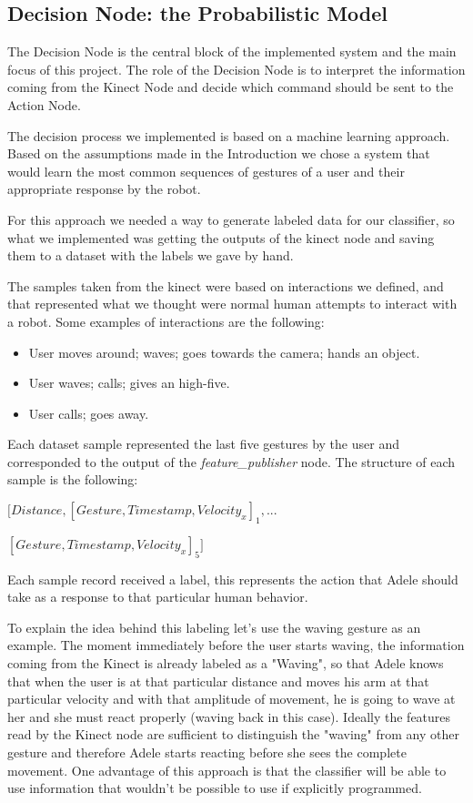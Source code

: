 \subsection{Decision Node: the Probabilistic Model}
The Decision Node is the central block of the implemented system and the main focus of this project. The role of the Decision Node is to interpret the information coming from the Kinect Node and decide which command should be sent to the Action Node.

The decision process we implemented is based on a machine learning approach. Based on the assumptions made in the Introduction we chose a system that would learn the most common sequences of gestures of a user and their appropriate response by the robot. 

For this approach we needed a way to generate labeled data for our classifier, so what we implemented was getting the outputs of the kinect node and saving them to a dataset with the labels we gave by hand.

The samples taken from the kinect were based on interactions we defined, and that represented what we thought were normal human attempts to interact with a robot. Some examples of interactions are the following:

\begin{itemize}
\item User moves around; waves; goes towards the camera; hands an object.
\item User waves; calls; gives an high-five.
\item User calls; goes away.
\end{itemize}

Each dataset sample represented the last five gestures by the user and corresponded to the output of the \textit{feature\_publisher} node. The structure of each sample is the following:

\vspace*{4pt}
$\Big[Distance, [Gesture, Timestamp, Velocity_x]_1,...$

$[Gesture, Timestamp, Velocity_x]_5\Big]$
\vspace*{4pt}

Each sample record received a label, this represents the action that Adele should take as a response to that particular human behavior.

To explain the idea behind this labeling let's use the waving gesture as an example. The moment immediately before the user starts waving, the information coming from the Kinect is already labeled as a "Waving", so that Adele knows that when the user is at that particular distance and moves his arm at that particular velocity and with that amplitude of movement, he is going to wave at her and she must react properly (waving back in this case). Ideally the features read by the Kinect node are sufficient to distinguish the "waving" from any other gesture and therefore Adele starts reacting before she sees the complete movement. One advantage of this approach is that the classifier will be able to use information that wouldn't be possible to use if explicitly programmed.	

